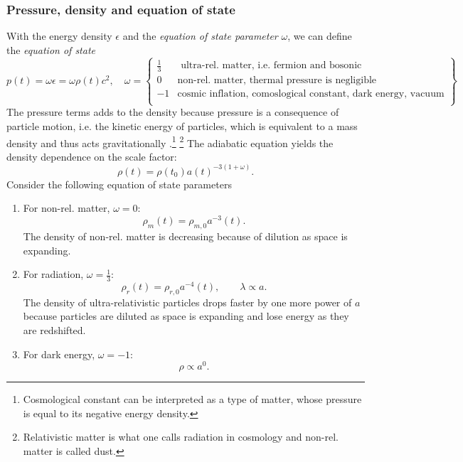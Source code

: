 \subsubsection{Pressure, density and equation of state}
With the energy density $\epsilon$ and the \emph{equation of state parameter} $\omega$, we can define the \emph{equation of state}
\begin{equation}
	p(t) = \omega \epsilon = \omega \rho(t) c^2,\quad \omega= \left\{		\begin{array}{lll}
\frac{1}{3} & \text{ ultra-rel. matter, i.e. fermion and bosonic}\\
0 &\text{non-rel. matter, thermal pressure is negligible}\\
-1 &\text{cosmic inflation, comoslogical constant, dark energy, vacuum}\\
	\end{array}	
	\right\}
\end{equation}
The pressure terms adds to the density because pressure is a consequence of particle motion, i.e. the kinetic energy of particles, which is equivalent to a mass density and thus acts gravitationally 
.\footnote{Cosmological constant can be interpreted as a type of matter, whose pressure is equal to its negative energy density.}
\footnote{Relativistic matter is what one calls radiation in cosmology and non-rel. matter is called dust.}
The adiabatic equation yields the density dependence on the scale factor:
\begin{equation}
	\rho(t)=\rho(t_0) a(t)^{-3(1+\omega)}.
\end{equation}
Consider the following equation of state parameters
\begin{enumerate}
	\item For non-rel. matter, $\omega=0$:\\
	\begin{equation}
		\rho_m(t)=\rho_{m,0}a^{-3}(t).
	\end{equation}
The density of non-rel. matter is decreasing because of dilution as space is expanding.
\item For radiation, $\omega=\frac{1}{3}$:\\
\begin{equation}
	\rho_r(t)=\rho_{r,0} a^{-4}(t),\qquad \lambda \propto a.
\end{equation}
The density of ultra-relativistic particles drops faster by one more power of $a$ because particles are diluted as space is expanding and lose energy as they are redshifted.
\item For dark energy, $\omega=-1$:\\
\begin{equation}
\rho \propto a^0.
\end{equation}
\end{enumerate}


